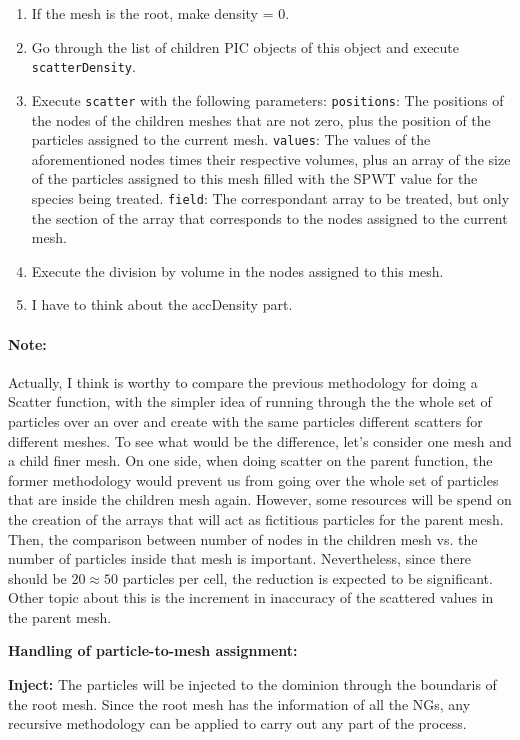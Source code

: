 \documentclass[reprint,aps]{revtex4-1}
\begin{document}
\begin{enumerate}

\item If the mesh is the root, make density = 0.
\item Go through the list of children PIC objects of this object and execute \texttt{scatterDensity}.
\item  Execute \texttt{scatter} with the following parameters:
\texttt{positions}: The positions of the nodes of the children meshes that are not zero, plus the position of the particles assigned to the current mesh.
\texttt{values}: The values of the aforementioned nodes times their respective volumes, plus an array of the size of the particles assigned to this mesh filled with the SPWT value for the species being treated. 
\texttt{field}: The correspondant array to be treated, but only the section of the array that corresponds to the nodes assigned to the current mesh.
\item Execute the division by volume in the nodes assigned to this mesh.
\item I have to think about the accDensity part.

\end{enumerate}

\paragraph*{\textbf{Note:}} Actually, I think is worthy to compare the previous methodology for doing a Scatter function, with the simpler idea of running through the the whole set of particles over an over and create with the same particles different scatters for different meshes. To see what would be the difference, let's consider one mesh and a child finer mesh. On one side, when doing scatter on the parent function, the former methodology would prevent us from going over the whole set of particles that are inside the children mesh again. However, some resources will be spend on the creation of the arrays that will act as fictitious particles for the parent mesh. Then, the comparison between number of nodes in the children mesh vs. the number of particles inside that mesh is important. Nevertheless, since there should be $20 \approx 50$ particles per cell, the reduction is expected to be significant. Other topic about this is the increment in inaccuracy of the scattered values in the parent mesh.

\textbf{Handling of particle-to-mesh assignment:} 

\textbf{Inject:} The particles will be injected to the dominion through the boundaris of the root mesh. Since the root mesh has the information of all the NGs, any recursive methodology can be applied to carry out any part of the process.
\end{document}

